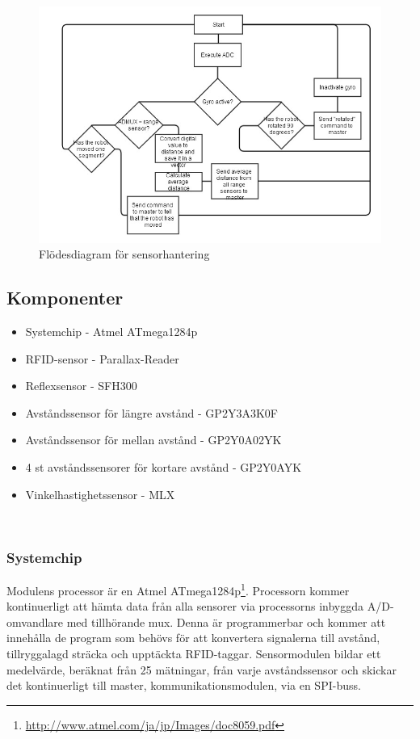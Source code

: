 \documentclass[a4paper,12pt,fleqn]{article}
\begin{document}
\begin{figure}[htp] %
  \begin{center}
  \includegraphics[keepaspectratio=true,width=0.6\linewidth]{bilder/sensorflode}  %
  \end{center}
  \caption{Flödesdiagram för sensorhantering} %
  \label{fig:sensorflow}
\end{figure}

\subsection{Komponenter}
\begin{itemize}
	\item Systemchip - Atmel ATmega1284p
	\item RFID-sensor - Par\-all\-ax-Read\-er\
	\item Reflexsensor - SFH300
	\item Avståndssensor för längre avstånd - GP\-2Y3A\-3K\-0F
	\item Avståndssensor för mellan avstånd - GP2Y0A02YK
	\item 4 st avståndssensorer för kortare avstånd - GP\-2Y\-0A\-YK
	\item Vinkelhastighetssensor - MLX\-90\-609
\end{itemize}
~\\

\subsubsection{Systemchip}
Modulens processor är en Atmel ATmega1284p\footnote{\url{http://www.atmel.com/ja/jp/Images/doc8059.pdf}}. Processorn kommer kontinuerligt att hämta data från alla sensorer via processorns inbyggda A/D-omvandlare med tillhörande mux. Denna är programmerbar och kommer att innehålla de program som behövs för att konvertera signalerna till avstånd, tillryggalagd sträcka och upptäckta RFID-taggar. Sensormodulen bildar ett medelvärde, beräknat från 25 mätningar, från varje avståndssensor och skickar det kontinuerligt till master, 
kommunikationsmodulen, via en SPI-buss.
\end{document}
